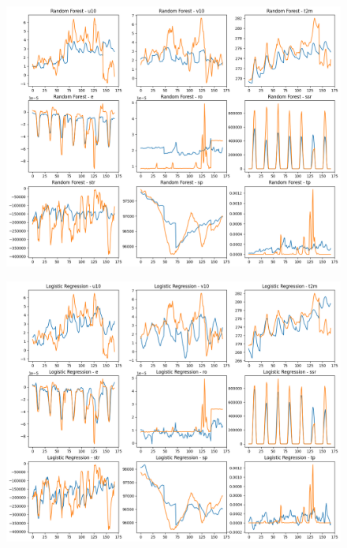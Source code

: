 \begin{figure}[H]
    \centering
    \includegraphics[width=\textwidth]{images/random_forest_week.png}
    \caption{}
    \label{forest-week}
\end{figure}

\begin{figure}[H]
    \centering
    \includegraphics[width=\textwidth]{images/regression_week.png}
    \caption{}
    \label{regression-week}
\end{figure}


